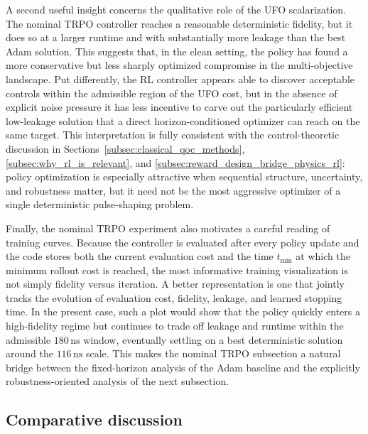 A second useful insight concerns the qualitative role of the UFO scalarization. The nominal TRPO controller reaches a reasonable deterministic fidelity, but it does so at a larger runtime and with substantially more leakage than the best Adam solution. This suggests that, in the clean setting, the policy has found a more conservative but less sharply optimized compromise in the multi-objective landscape. Put differently, the RL controller appears able to discover acceptable controls within the admissible region of the UFO cost, but in the absence of explicit noise pressure it has less incentive to carve out the particularly efficient low-leakage solution that a direct horizon-conditioned optimizer can reach on the same target. This interpretation is fully consistent with the control-theoretic discussion in Sections~\ref{subsec:classical_qoc_methods}, \ref{subsec:why_rl_is_relevant}, and \ref{subsec:reward_design_bridge_physics_rl}: policy optimization is especially attractive when sequential structure, uncertainty, and robustness matter, but it need not be the most aggressive optimizer of a single deterministic pulse-shaping problem.

Finally, the nominal TRPO experiment also motivates a careful reading of training curves. Because the controller is evaluated after every policy update and the code stores both the current evaluation cost and the time \(t_{\min}\) at which the minimum rollout cost is reached, the most informative training visualization is not simply fidelity versus iteration. A better representation is one that jointly tracks the evolution of evaluation cost, fidelity, leakage, and learned stopping time. In the present case, such a plot would show that the policy quickly enters a high-fidelity regime but continues to trade off leakage and runtime within the admissible \(180\,\mathrm{ns}\) window, eventually settling on a best deterministic solution around the \(116\,\mathrm{ns}\) scale. This makes the nominal TRPO subsection a natural bridge between the fixed-horizon analysis of the Adam baseline and the explicitly robustness-oriented analysis of the next subsection.


\subsection{Comparative discussion}
\label{subsec:comparative_discussion_single_target}

